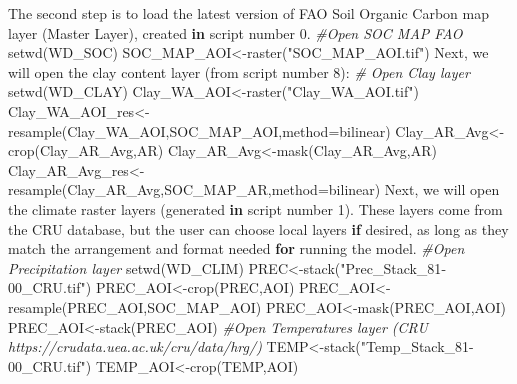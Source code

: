 \documentclass[
  10pt,
  b5paper,
]{book}
\newenvironment{Shaded}{\begin{snugshade}}{\end{snugshade}}
\newcommand{\AttributeTok}[1]{\textcolor[rgb]{0.77,0.63,0.00}{#1}}
\newcommand{\CommentTok}[1]{\textcolor[rgb]{0.56,0.35,0.01}{\textit{#1}}}
\newcommand{\ControlFlowTok}[1]{\textcolor[rgb]{0.13,0.29,0.53}{\textbf{#1}}}
\newcommand{\DecValTok}[1]{\textcolor[rgb]{0.00,0.00,0.81}{#1}}
\newcommand{\FloatTok}[1]{\textcolor[rgb]{0.00,0.00,0.81}{#1}}
\newcommand{\FunctionTok}[1]{\textcolor[rgb]{0.00,0.00,0.00}{#1}}
\newcommand{\NormalTok}[1]{#1}
\newcommand{\OtherTok}[1]{\textcolor[rgb]{0.56,0.35,0.01}{#1}}
\newcommand{\SpecialCharTok}[1]{\textcolor[rgb]{0.00,0.00,0.00}{#1}}
\newcommand{\StringTok}[1]{\textcolor[rgb]{0.31,0.60,0.02}{#1}}
\begin{document}
\begin{Shaded}
\begin{Highlighting}[]
\NormalTok{The second step is to load the latest version of FAO Soil Organic Carbon map }\FunctionTok{layer}\NormalTok{ (Master Layer), created }\ControlFlowTok{in}\NormalTok{ script number }\FloatTok{0.} 
\CommentTok{\#Open SOC MAP FAO}
\FunctionTok{setwd}\NormalTok{(WD\_SOC)}
\NormalTok{SOC\_MAP\_AOI}\OtherTok{\textless{}{-}}\FunctionTok{raster}\NormalTok{(}\StringTok{"SOC\_MAP\_AOI.tif"}\NormalTok{)}
\NormalTok{ Next, we will open the clay content }\FunctionTok{layer}\NormalTok{ (from script number }\DecValTok{8}\NormalTok{)}\SpecialCharTok{:}
\CommentTok{\# Open Clay layer}
\FunctionTok{setwd}\NormalTok{(WD\_CLAY)}
\NormalTok{Clay\_WA\_AOI}\OtherTok{\textless{}{-}}\FunctionTok{raster}\NormalTok{(}\StringTok{"Clay\_WA\_AOI.tif"}\NormalTok{)}
\NormalTok{Clay\_WA\_AOI\_res}\OtherTok{\textless{}{-}}\FunctionTok{resample}\NormalTok{(Clay\_WA\_AOI,SOC\_MAP\_AOI,}\AttributeTok{method=}\StringTok{\textquotesingle{}bilinear\textquotesingle{}}\NormalTok{) }
\NormalTok{Clay\_AR\_Avg}\OtherTok{\textless{}{-}}\FunctionTok{crop}\NormalTok{(Clay\_AR\_Avg,AR)}
\NormalTok{Clay\_AR\_Avg}\OtherTok{\textless{}{-}}\FunctionTok{mask}\NormalTok{(Clay\_AR\_Avg,AR)}
\NormalTok{Clay\_AR\_Avg\_res}\OtherTok{\textless{}{-}}\FunctionTok{resample}\NormalTok{(Clay\_AR\_Avg,SOC\_MAP\_AR,}\AttributeTok{method=}\StringTok{\textquotesingle{}bilinear\textquotesingle{}}\NormalTok{) }
\NormalTok{Next, we will open the climate raster }\FunctionTok{layers}\NormalTok{ (generated }\ControlFlowTok{in}\NormalTok{ script number }\DecValTok{1}\NormalTok{).  These layers come from the CRU database, but the user can choose local layers }\ControlFlowTok{if}\NormalTok{ desired, as long as they match the arrangement and format needed }\ControlFlowTok{for}\NormalTok{ running the model.}
\CommentTok{\#Open Precipitation layer }
\FunctionTok{setwd}\NormalTok{(WD\_CLIM)}
\NormalTok{PREC}\OtherTok{\textless{}{-}}\FunctionTok{stack}\NormalTok{(}\StringTok{"Prec\_Stack\_81{-}00\_CRU.tif"}\NormalTok{)}
\NormalTok{PREC\_AOI}\OtherTok{\textless{}{-}}\FunctionTok{crop}\NormalTok{(PREC,AOI)}
\NormalTok{PREC\_AOI}\OtherTok{\textless{}{-}}\FunctionTok{resample}\NormalTok{(PREC\_AOI,SOC\_MAP\_AOI)}
\NormalTok{PREC\_AOI}\OtherTok{\textless{}{-}}\FunctionTok{mask}\NormalTok{(PREC\_AOI,AOI)}
\NormalTok{PREC\_AOI}\OtherTok{\textless{}{-}}\FunctionTok{stack}\NormalTok{(PREC\_AOI)}
\CommentTok{\#Open Temperatures layer (CRU https://crudata.uea.ac.uk/cru/data/hrg/)}
\NormalTok{TEMP}\OtherTok{\textless{}{-}}\FunctionTok{stack}\NormalTok{(}\StringTok{"Temp\_Stack\_81{-}00\_CRU.tif"}\NormalTok{)}
\NormalTok{TEMP\_AOI}\OtherTok{\textless{}{-}}\FunctionTok{crop}\NormalTok{(TEMP,AOI)}

\end{Highlighting}
\end{Shaded}
\end{document}

